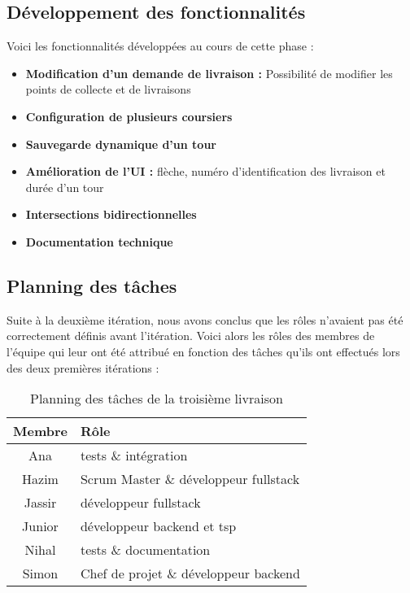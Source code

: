 \documentclass[a4paper]{article}
\begin{document}
\subsection{Développement des fonctionnalités}
Voici les fonctionnalités développées au cours de cette phase :
\begin{itemize}
    \item \textbf{Modification d'un demande de livraison :} Possibilité de modifier les points de collecte et de livraisons
    \item \textbf{Configuration de plusieurs coursiers} 
    \item \textbf{Sauvegarde dynamique d’un tour} 
    \item \textbf{Amélioration de l’UI :} flèche, numéro d’identification des livraison et durée d’un tour
    \item \textbf{Intersections bidirectionnelles}
    \item \textbf{Documentation technique}
\end{itemize}

\subsection{Planning des tâches}
Suite à la deuxième itération, nous avons conclus que les rôles n'avaient pas été correctement définis avant l'itération. Voici alors les rôles des membres de l'équipe qui leur ont été attribué en fonction des tâches qu'ils ont effectués lors des deux premières itérations :

\begin{table}[H]
    \centering
    \begin{tabularx}{0.6\textwidth}{|c|X|}
    \hline
    \textbf{Membre} & \textbf{Rôle} \\ \hline
    Ana  & tests \& intégration \\ \hline
    Hazim & Scrum Master \& développeur fullstack \\ \hline
    Jassir & développeur fullstack \\ \hline
    Junior &  développeur backend et tsp \\ \hline
    Nihal  & tests \& documentation \\ \hline
    Simon & Chef de projet \& développeur backend \\ \hline
    \end{tabularx}
    \caption{Planning des tâches de la troisième livraison}
    \end{table}
\end{document}
